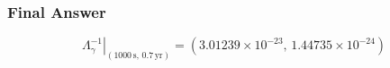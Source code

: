 \subsubsection*{Final Answer}

\[
\boxed{
\left.\Lambda_\gamma^{-1}\right|_{(1000\,\mathrm{s},\,0.7\,\mathrm{yr})}
=\left(3.01239\times10^{-23},\,1.44735\times10^{-24}\right)
}
\]
